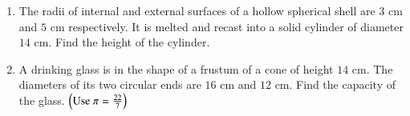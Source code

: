 \begin{enumerate}
\item The radii of internal and external surfaces of a hollow spherical shell are $3\text{ cm}$ and $5\text{ cm}$ respectively. It is melted and recast into a solid cylinder of diameter $14\text{ cm}$. Find the height of the cylinder. 

\item A drinking glass is in the shape of a frustum of a cone of height $14\text{ cm}$. The diameters of its two circular ends are $16\text{ cm}$ and $12\text{ cm}$. Find the capacity of the glass. $\left(\text{Use } \pi = \frac{22}{7}\right)$ 

\end{enumerate}
